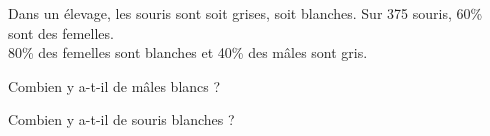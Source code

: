 Dans un élevage, les souris sont soit grises, soit blanches.
Sur 375 souris, 60\% sont des femelles.\\80\% des femelles sont blanches et 40\% des mâles sont gris.
\begin{myenumerate}
\item Combien y a-t-il de mâles blancs ?
\item Combien y a-t-il de souris blanches ?
\end{myenumerate}
